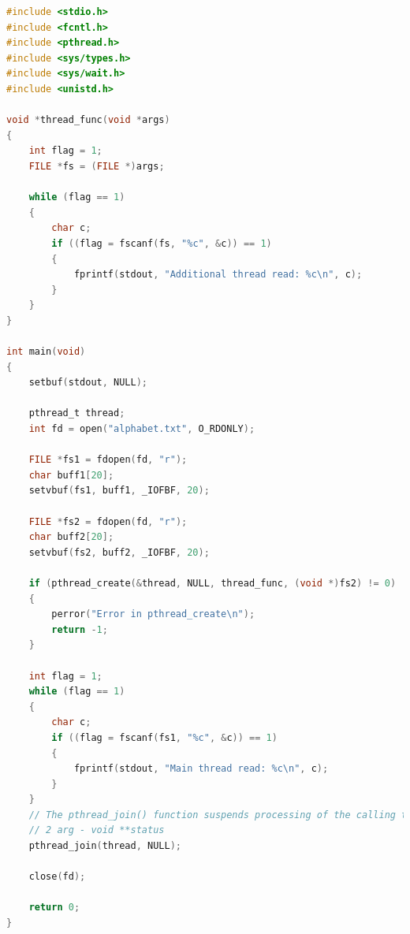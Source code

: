 \documentclass[12pt]{report}
\begin{document}
\begin{lstlisting}[language=c, label=p1thread, caption=Первая программа (реализация с потоками)]
#include <stdio.h>
#include <fcntl.h>
#include <pthread.h>
#include <sys/types.h>
#include <sys/wait.h>
#include <unistd.h>

void *thread_func(void *args)
{
    int flag = 1;
    FILE *fs = (FILE *)args;

    while (flag == 1)
    {
        char c;
        if ((flag = fscanf(fs, "%c", &c)) == 1)
        {
            fprintf(stdout, "Additional thread read: %c\n", c);
        }
    }
}

int main(void)
{
    setbuf(stdout, NULL);

    pthread_t thread;
    int fd = open("alphabet.txt", O_RDONLY);

    FILE *fs1 = fdopen(fd, "r");
    char buff1[20];
    setvbuf(fs1, buff1, _IOFBF, 20);

    FILE *fs2 = fdopen(fd, "r");
    char buff2[20];
    setvbuf(fs2, buff2, _IOFBF, 20);

    if (pthread_create(&thread, NULL, thread_func, (void *)fs2) != 0)
	{
		perror("Error in pthread_create\n");
		return -1;
	}

    int flag = 1;
    while (flag == 1)
    {
        char c;
        if ((flag = fscanf(fs1, "%c", &c)) == 1)
        {
            fprintf(stdout, "Main thread read: %c\n", c);
        }
    }
	// The pthread_join() function suspends processing of the calling thread until the target thread completes.
	// 2 arg - void **status
    pthread_join(thread, NULL);

    close(fd);

    return 0;
}
\end{lstlisting}
\end{document}
